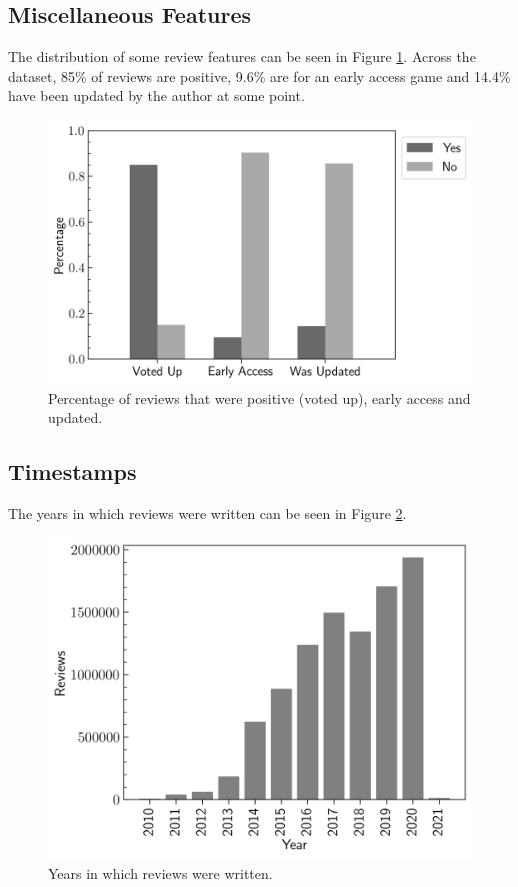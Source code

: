 \subsection{Miscellaneous Features} \label{sec:Dataset_Reviews_MF}

The distribution of some review features can be seen in Figure \ref{fig:Dataset_BarsCounts}. Across the dataset, 85\% of reviews are positive, 9.6\% are for an early access game and 14.4\% have been updated by the author at some point.

\begin{figure}[ht]
    \centering
    \includegraphics[scale=0.55]{figures/03_dataset/08_bars_counts.png}
    \caption{Percentage of reviews that were positive (voted up), early access and updated.}
    \label{fig:Dataset_BarsCounts}
\end{figure}

\subsection{Timestamps} \label{sec:Dataset_Reviews_TS}

The years in which reviews were written can be seen in Figure \ref{fig:Dataset_BarsTimestamps}.

\begin{figure}[ht]
    \centering
    \includegraphics[scale=0.55]{figures/03_dataset/09_bars_review_dates.png}
    \caption{Years in which reviews were written.}
    \label{fig:Dataset_BarsTimestamps}
\end{figure}

